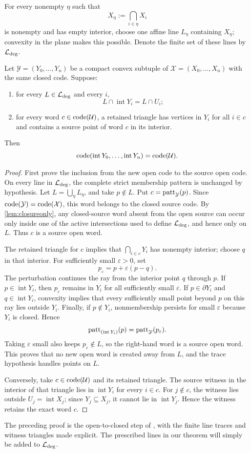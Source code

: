 For every nonempty $\eta$ such that
\[
 X_\eta:=\bigcap_{i\in\eta}X_i
\]
is nonempty and has empty interior, choose one affine line $L_\eta$
containing $X_\eta$; convexity in the plane makes this possible.  Denote the
finite set of these lines by $\mathcal L_{\rm deg}$.

\begin{lemma}\label{lem:openrecovery}
Let $\mathcal Y=(Y_0,\ldots,Y_n)$ be a compact convex subtuple of
$\mathcal X=(X_0,\ldots,X_n)$ with the same closed code.  Suppose:
\begin{enumerate}
\item for every $L\in\mathcal L_{\rm deg}$ and every $i$,
      \[
        L\cap\operatorname{int}Y_i=L\cap U_i;
      \]
\item for every word $c\in\operatorname{code}(\mathcal U)$, a retained triangle has
      vertices in $Y_i$ for all $i\in c$ and contains a source point of
      word $c$ in its interior.
\end{enumerate}
Then
\[
 \operatorname{code}(\operatorname{int}Y_0,\ldots,\operatorname{int}Y_n)
 =\operatorname{code}(\mathcal U).
\]
\end{lemma}

\begin{proof}
First prove the inclusion from the new open code to the source open code.
On every line in $\mathcal L_{\rm deg}$, the complete strict membership
pattern is unchanged by hypothesis.  Let
$L=\bigcup_{\eta}L_\eta$, and take $p\notin L$.  Put
$c=\operatorname{patt}_{\mathcal Y}(p)$.  Since $\operatorname{code}(\mathcal Y)=\operatorname{code}(\mathcal X)$,
this word belongs to the closed source code.  By
\cref{lem:closureonly}, any closed-source word absent from the open source
can occur only inside one of the active intersections used to define
$\mathcal L_{\rm deg}$, and hence only on $L$.  Thus $c$ is a source open
word.

The retained triangle for $c$ implies that
$\bigcap_{i\in c}Y_i$ has nonempty interior; choose
$q$ in that interior.  For sufficiently small $\varepsilon>0$, set
\[
 p_\varepsilon=p+\varepsilon(p-q).
\]
The perturbation continues the ray from the interior point $q$ through
$p$.  If $p\in\operatorname{int}Y_i$, then $p_\varepsilon$ remains in
$Y_i$ for all sufficiently small $\varepsilon$.  If
$p\in\partial Y_i$ and $q\in\operatorname{int}Y_i$, convexity implies
that every sufficiently small point beyond $p$ on this ray lies outside
$Y_i$.  Finally, if $p\notin Y_i$, nonmembership persists for small
$\varepsilon$ because $Y_i$ is closed.  Hence
\[
 \operatorname{patt}_{(\operatorname{int}Y_i)}(p)
 =\operatorname{patt}_{\mathcal Y}(p_\varepsilon).
\]
Taking $\varepsilon$ small also keeps $p_\varepsilon\notin L$, so the
right-hand word is a source open word.  This proves that no new open word is
created away from $L$, and the trace hypothesis handles points on $L$.

Conversely, take $c\in\operatorname{code}(\mathcal U)$ and its retained triangle.  The
source witness in the interior of that triangle lies in
$\operatorname{int}Y_i$ for every $i\in c$.  For $j\notin c$, the witness
lies outside $U_j=\operatorname{int}X_j$; since $Y_j\subseteq X_j$, it
cannot lie in $\operatorname{int}Y_j$.  Hence the witness retains the exact
word $c$.
\end{proof}

The preceding proof is the open-to-closed step of
\citet{BukhJeffs2023}, with the finite line traces and witness triangles
made explicit.  The prescribed lines in our theorem will simply be added to
$\mathcal L_{\rm deg}$.
